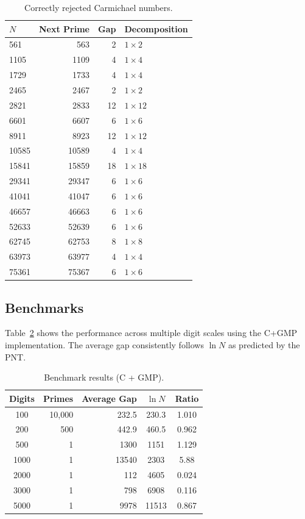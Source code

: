 \documentclass[12pt,a4paper]{article}
\theoremstyle{plain}
\begin{document}
\begin{table}[htbp]
\centering
\caption{Correctly rejected Carmichael numbers.}
\label{tab:carmichael}
\begin{tabular}{lrrl}
\hline
$N$ & Next Prime & Gap & Decomposition \\
\hline
561 & 563 & 2 & $1\times2$ \\
1105 & 1109 & 4 & $1\times4$ \\
1729 & 1733 & 4 & $1\times4$ \\
2465 & 2467 & 2 & $1\times2$ \\
2821 & 2833 & 12 & $1\times12$ \\
6601 & 6607 & 6 & $1\times6$ \\
8911 & 8923 & 12 & $1\times12$ \\
10585 & 10589 & 4 & $1\times4$ \\
15841 & 15859 & 18 & $1\times18$ \\
29341 & 29347 & 6 & $1\times6$ \\
41041 & 41047 & 6 & $1\times6$ \\
46657 & 46663 & 6 & $1\times6$ \\
52633 & 52639 & 6 & $1\times6$ \\
62745 & 62753 & 8 & $1\times8$ \\
63973 & 63977 & 4 & $1\times4$ \\
75361 & 75367 & 6 & $1\times6$ \\
\hline
\end{tabular}
\end{table}

\subsection{Benchmarks}

Table~\ref{tab:bench} shows the performance across multiple digit scales using the
C+GMP implementation. The average gap consistently follows
$\ln N$ as predicted by the PNT.

\begin{table}[htbp]
\centering
\caption{Benchmark results (C + GMP).}
\label{tab:bench}
\begin{tabular}{crrcc}
\hline
Digits & Primes & Average Gap & $\ln N$ & Ratio \\
\hline
100 & 10,000 & 232.5 & 230.3 & 1.010 \\
200 & 500 & 442.9 & 460.5 & 0.962 \\
500 & 1 & 1300 & 1151 & 1.129 \\
1000 & 1 & 13540 & 2303 & 5.88 \\
2000 & 1 & 112 & 4605 & 0.024 \\
3000 & 1 & 798 & 6908 & 0.116 \\
5000 & 1 & 9978 & 11513 & 0.867 \\
\hline
\end{tabular}
\end{table}
\end{document}
